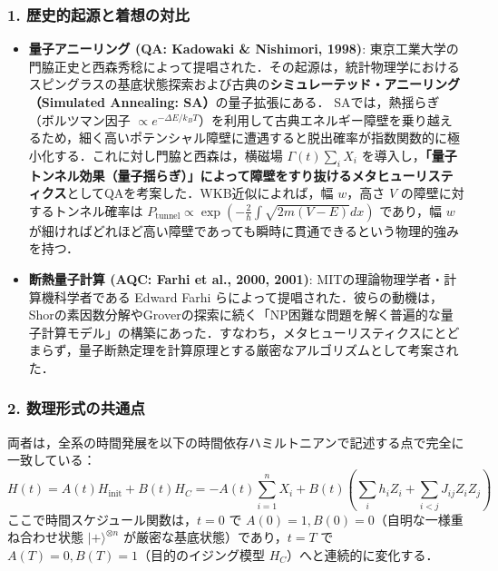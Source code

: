 \documentclass[11pt,a4paper,oneside,openany]{ltjsbook}
\theoremstyle{definition}
\theoremstyle{plain}
\theoremstyle{remark}
\newcommand{\ket}[1]{|#1\rangle}
\begin{document}
\subsubsection*{1. 歴史的起源と着想の対比}
\begin{itemize}
    \item \textbf{量子アニーリング (QA: Kadowaki \& Nishimori, 1998\cite{kadowaki1998quantum})}:
    東京工業大学の門脇正史と西森秀稔によって提唱された．その起源は，統計物理学におけるスピングラスの基底状態探索および古典の\textbf{シミュレーテッド・アニーリング（Simulated Annealing: SA\cite{kirkpatrick1983optimization}）}の量子拡張にある．
    SAでは，熱揺らぎ（ボルツマン因子 $\propto e^{-\Delta E / k_B T}$）を利用して古典エネルギー障壁を乗り越えるため，細く高いポテンシャル障壁に遭遇すると脱出確率が指数関数的に極小化する．これに対し門脇と西森は，横磁場 $\Gamma(t) \sum_i X_i$ を導入し，\textbf{「量子トンネル効果（量子揺らぎ）」によって障壁をすり抜けるメタヒューリスティクス}としてQAを考案した．WKB近似によれば，幅 $w$，高さ $V$ の障壁に対するトンネル確率は $P_{\text{tunnel}} \propto \exp\left(-\frac{2}{\hbar}\int \sqrt{2m(V - E)}dx\right)$ であり，幅 $w$ が細ければどれほど高い障壁であっても瞬時に貫通できるという物理的強みを持つ．
    
    \item \textbf{断熱量子計算 (AQC: Farhi et al., 2000\cite{farhi2000quantum}, 2001\cite{farhi2001quantum})}:
    MITの理論物理学者・計算機科学者である Edward Farhi らによって提唱された．彼らの動機は，Shorの素因数分解やGroverの探索に続く「NP困難な問題を解く普遍的な量子計算モデル」の構築にあった．すなわち，メタヒューリスティクスにとどまらず，量子断熱定理\cite{born1928beweis,kato1950adiabatic}を計算原理とする厳密なアルゴリズムとして考案された．
\end{itemize}

\subsubsection*{2. 数理形式の共通点}
両者は，全系の時間発展を以下の時間依存ハミルトニアンで記述する点で完全に一致している：
\begin{equation}
    H(t) = A(t) H_{\text{init}} + B(t) H_C = -A(t)\sum_{i=1}^n X_i + B(t)\left(\sum_{i} h_i Z_i + \sum_{i<j} J_{ij} Z_i Z_j\right)
\end{equation}
ここで時間スケジュール関数は，$t=0$ で $A(0) = 1, B(0) = 0$（自明な一様重ね合わせ状態 $\ket{+}^{\otimes n}$ が厳密な基底状態）であり，$t=T$ で $A(T) = 0, B(T) = 1$（目的のイジング模型 $H_C$）へと連続的に変化する．
\end{document}
